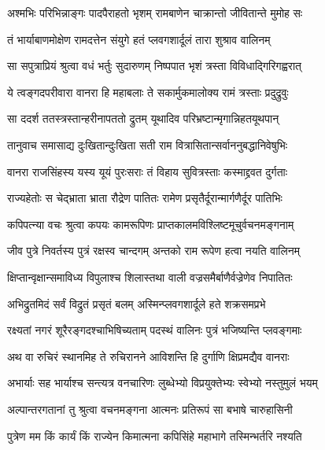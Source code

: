 \twolineshloka
{अश्मभिः परिभिन्नाङ्गः पादपैराहतो भृशम्}
{रामबाणेन चाक्रान्तो जीवितान्ते मुमोह सः} %

\twolineshloka
{तं भार्याबाणमोक्षेण रामदत्तेन संयुगे}
{हतं प्लवगशार्दूलं तारा शुश्राव वालिनम्} %

\twolineshloka
{सा सपुत्राप्रियं श्रुत्वा वधं भर्तुः सुदारुणम्}
{निष्पपात भृशं त्रस्ता विविधाद्गिरिगह्वरात्} %

\twolineshloka
{ये त्वङ्गदपरीवारा वानरा हि महाबलाः}
{ते सकार्मुकमालोक्य रामं त्रस्ताः प्रदुद्रुवुः} %

\twolineshloka
{सा ददर्श ततस्त्रस्तान्हरीनापततो द्रुतम्}
{यूथादिव परिभ्रष्टान्मृगान्निहतयूथपान्} %

\twolineshloka
{तानुवाच समासाद्य दुःखितान्दुःखिता सती}
{राम वित्रासितान्सर्वाननुबद्धानिवेषुभिः} %

\twolineshloka
{वानरा राजसिंहस्य यस्य यूयं पुरःसराः}
{तं विहाय सुवित्रस्ताः कस्माद्द्रवत दुर्गताः} %

\twolineshloka
{राज्यहेतोः स चेद्भ्राता भ्राता रौद्रेण पातितः}
{रामेण प्रसृतैर्दूरान्मार्गणैर्दूर पातिभिः} %

\twolineshloka
{कपिपत्न्या वचः श्रुत्वा कपयः कामरूपिणः}
{प्राप्तकालमविश्लिष्टमूचुर्वचनमङ्गनाम्} %

\twolineshloka
{जीव पुत्रे निवर्तस्य पुत्रं रक्षस्व चान्दगम्}
{अन्तको राम रूपेण हत्वा नयति वालिनम्} %

\twolineshloka
{क्षिप्तान्वृक्षान्समाविध्य विपुलाश्च शिलास्तथा}
{वाली वज्रसमैर्बाणैर्वज्रेणेव निपातितः} %

\twolineshloka
{अभिद्रुतमिदं सर्वं विद्रुतं प्रसृतं बलम्}
{अस्मिन्प्लवगशार्दूले हते शक्रसमप्रभे} %

\twolineshloka
{रक्ष्यतां नगरं शूरैरङ्गदश्चाभिषिच्यताम्}
{पदस्थं वालिनः पुत्रं भजिष्यन्ति प्लवङ्गमाः} %

\twolineshloka
{अथ वा रुचिरं स्थानमिह ते रुचिरानने}
{आविशन्ति हि दुर्गाणि क्षिप्रमद्यैव वानराः} %

\twolineshloka
{अभार्याः सह भार्याश्च सन्त्यत्र वनचारिणः}
{लुब्धेभ्यो विप्रयुक्तेभ्यः स्वेभ्यो नस्तुमुलं भयम्} %

\twolineshloka
{अल्पान्तरगतानां तु श्रुत्वा वचनमङ्गना}
{आत्मनः प्रतिरूपं सा बभाषे चारुहासिनी} %

\twolineshloka
{पुत्रेण मम किं कार्यं किं राज्येन किमात्मना}
{कपिसिंहे महाभागे तस्मिन्भर्तरि नश्यति} %

